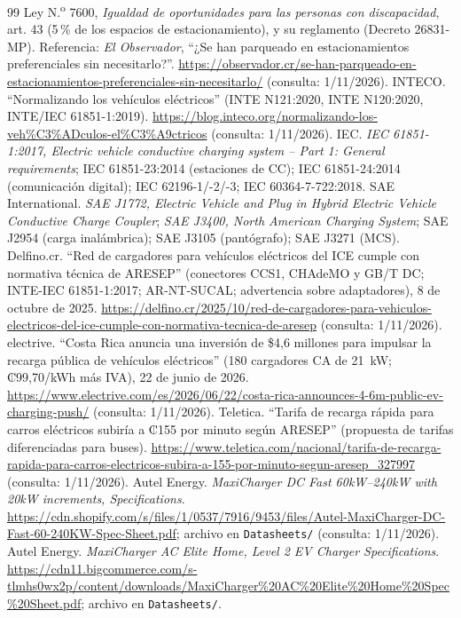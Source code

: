 \begin{thebibliography}{99}
 Ley N.\textsuperscript{o} 7600, \emph{Igualdad de oportunidades para las personas con discapacidad}, art. 43 (5\,\% de los espacios de estacionamiento), y su reglamento (Decreto 26831-MP). Referencia: \emph{El Observador}, ``¿Se han parqueado en estacionamientos preferenciales sin necesitarlo?''. \url{https://observador.cr/se-han-parqueado-en-estacionamientos-preferenciales-sin-necesitarlo/} (consulta: 1/11/2026).
 INTECO. ``Normalizando los vehículos eléctricos'' (INTE N121:2020, INTE N120:2020, INTE/IEC 61851-1:2019). \url{https://blog.inteco.org/normalizando-los-veh\%C3\%ADculos-el\%C3\%A9ctricos} (consulta: 1/11/2026).
 IEC. \emph{IEC 61851-1:2017, Electric vehicle conductive charging system -- Part 1: General requirements}; IEC 61851-23:2014 (estaciones de CC); IEC 61851-24:2014 (comunicación digital); IEC 62196-1/-2/-3; IEC 60364-7-722:2018.
 SAE International. \emph{SAE J1772, Electric Vehicle and Plug in Hybrid Electric Vehicle Conductive Charge Coupler}; \emph{SAE J3400, North American Charging System}; SAE J2954 (carga inalámbrica); SAE J3105 (pantógrafo); SAE J3271 (MCS).
 Delfino.cr. ``Red de cargadores para vehículos eléctricos del ICE cumple con normativa técnica de ARESEP'' (conectores CCS1, CHAdeMO y GB/T DC; INTE-IEC 61851-1:2017; AR-NT-SUCAL; advertencia sobre adaptadores), 8 de octubre de 2025. \url{https://delfino.cr/2025/10/red-de-cargadores-para-vehiculos-electricos-del-ice-cumple-con-normativa-tecnica-de-aresep} (consulta: 1/11/2026).
 electrive. ``Costa Rica anuncia una inversión de \$4,6 millones para impulsar la recarga pública de vehículos eléctricos'' (180 cargadores CA de 21~kW; ₡99,70/kWh más IVA), 22 de junio de 2026. \url{https://www.electrive.com/es/2026/06/22/costa-rica-announces-4-6m-public-ev-charging-push/} (consulta: 1/11/2026).
 Teletica. ``Tarifa de recarga rápida para carros eléctricos subiría a ₡155 por minuto según ARESEP'' (propuesta de tarifas diferenciadas para buses). \url{https://www.teletica.com/nacional/tarifa-de-recarga-rapida-para-carros-electricos-subira-a-155-por-minuto-segun-aresep_327997} (consulta: 1/11/2026).
 Autel Energy. \emph{MaxiCharger DC Fast 60kW--240kW with 20kW increments, Specifications}. \url{https://cdn.shopify.com/s/files/1/0537/7916/9453/files/Autel-MaxiCharger-DC-Fast-60-240KW-Spec-Sheet.pdf}; archivo en \texttt{Datasheets/} (consulta: 1/11/2026).
 Autel Energy. \emph{MaxiCharger AC Elite Home, Level 2 EV Charger Specifications}. \url{https://cdn11.bigcommerce.com/s-tlmhs0wx2p/content/downloads/MaxiCharger\%20AC\%20Elite\%20Home\%20Spec\%20Sheet.pdf}; archivo en \texttt{Datasheets/}.

\end{thebibliography}

